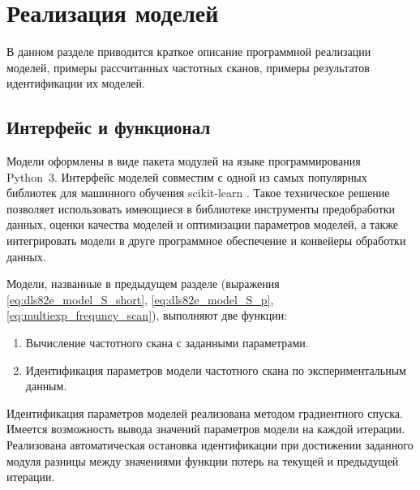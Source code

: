 \section{Реализация моделей}
	В данном разделе приводится краткое описание программной реализации
	моделей, примеры рассчитанных частотных сканов, примеры результатов
	идентификации их моделей.


	\subsection{Интерфейс и функционал}
	Модели оформлены в виде пакета модулей на языке программирования Python~3.
	Интерфейс моделей совместим с одной из самых популярных библиотек для 
	машинного обучения scikit-learn \cite{sklearn_website}. Такое техническое
	решение позволяет использовать имеющиеся в библиотеке инструменты 
	предобработки данных, оценки качества моделей и оптимизации параметров 
	моделей, а также интегрировать модели в друге программное обеспечение и 
	конвейеры обработки данных.

	Модели, названные в предыдущем разделе (выражения
	\ref{eq:dls82e_model_S_short}, \ref{eq:dls82e_model_S_p}, 
	\ref{eq:multiexp_frequncy_scan}), выполняют две функции:
	\begin{enumerate}
		\item Вычисление частотного скана с заданными параметрами.
		\item Идентификация параметров модели частотного скана по 
		экспериментальным данным.
	\end{enumerate}
	Идентификация параметров моделей реализована методом градиентного спуска.
	Имеется возможность вывода значений параметров модели на каждой итерации.
	Реализована автоматическая остановка идентификации при достижении заданного
	модуля разницы между значениями функции потерь на текущей и предыдущей 
	итерации.

